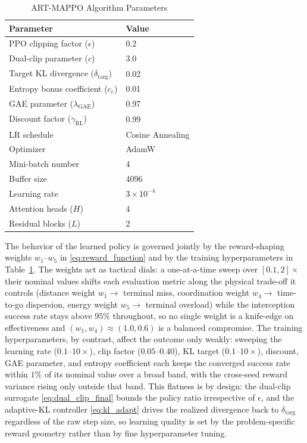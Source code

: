 \documentclass[lettersize,journal]{IEEEtran}
\newcommand{\hladd}[1]{{\color{blue}#1}}
\begin{document}
\begin{table}[!t]
\centering
\renewcommand{\arraystretch}{1.4}
\caption{ART-MAPPO Algorithm Parameters}
\label{table2}
\begin{tabular}{ll}
\hline\hline
Parameter & Value \\ \hline
PPO clipping factor ($\epsilon$) & 0.2 \\
Dual-clip parameter ($c$) & 3.0 \\
Target KL divergence ($\delta_{\text{targ}}$) & 0.02 \\
Entropy bonus coefficient ($c_e$) & 0.01 \\
GAE parameter ($\lambda_{\mathrm{GAE}}$) & 0.97 \\
\hladd{Discount factor ($\gamma_{\mathrm{RL}}$)} & \hladd{0.99} \\
LR schedule & Cosine Annealing \\
Optimizer & AdamW \\
Mini-batch number & 4 \\
Buffer size & 4096 \\
Learning rate & $3\times10^{-4}$ \\
Attention heads ($H$) & 4 \\
Residual blocks ($L$) & 2 \\ \hline
\end{tabular}
\end{table}

\hladd{The behavior of the learned policy is governed jointly by the reward-shaping weights
$w_1$--$w_5$ in \eqref{eq:reward_function} and by the training hyperparameters in
Table~\ref{table2}. The weights act as tactical dials: a one-at-a-time sweep over
$[0.1,2]\times$ their nominal values shifts each evaluation metric along the physical
trade-off it controls (distance weight $w_1\!\to\!$ terminal miss, coordination weight
$w_4\!\to\!$ time-to-go dispersion, energy weight $w_5\!\to\!$ terminal overload) while the
interception success rate stays above $95\%$ throughout, so no single weight is a knife-edge
on effectiveness and $(w_1,w_4)\!\approx\!(1.0,0.6)$ is a balanced compromise. The training
hyperparameters, by contrast, affect the outcome only weakly: sweeping the learning rate
($0.1$--$10\times$), clip factor ($0.05$--$0.40$), KL target ($0.1$--$10\times$), discount,
GAE parameter, and entropy coefficient each keeps the converged success rate within $1\%$ of
its nominal value over a broad band, with the cross-seed reward variance rising only outside
that band. This flatness is by design: the dual-clip surrogate \eqref{eq:dual_clip_final}
bounds the policy ratio irrespective of $\epsilon$, and the adaptive-KL controller
\eqref{eq:kl_adapt} drives the realized divergence back to $\delta_{\text{targ}}$ regardless of
the raw step size, so learning quality is set by the problem-specific reward geometry rather
than by fine hyperparameter tuning.}
\end{document}
